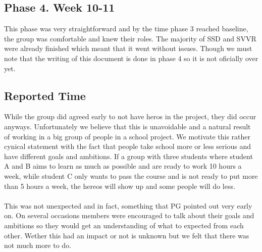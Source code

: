 \documentclass{article}
\begin{document}
    \subsection{Phase 4. Week 10-11}
        This phase was very straightforward and by the time phase 3 reached baseline, the group was
        comfortable and knew their roles. The majority of SSD and SVVR were already finished which
        meant that it went without issues. Though we must note that the writing of this document
        is done in phase 4 so it is not oficially over yet.

    \subsection{Reported Time}
        While the group did agreed early to not have heros in the project, they did occur anyways.
        Unfortunately we believe that this is unavoidable and a natural result of working in a big group of people
        in a school project. We motivate this rather cynical statement with the fact that people take school more or less serious and have different goals and ambitions. If a group with three students where student A and B
        aims to learn as much as possible and are ready to work 10 hours a week, while student C only wants to
        pass the course and is not ready to put more than 5 hours a week, the hereos will show up and 
        some people will do less.
        \\ \\
        This was not unexpected and in fact, something that PG pointed out very early on. On several occasions
        members were encouraged to talk about their goals and ambitions so they would get an understanding
        of what to expected from each other. Wether this had an impact or not is unknown but we felt that there was not much more to do.
    
\end{document}

